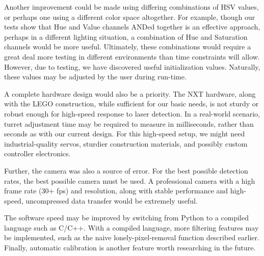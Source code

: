 \documentclass[10pt,twocolumn,letterpaper]{article}
\begin{document}
Another improvement could be made using differing combinations of HSV values, or perhaps one using a different color space altogether.  For example, though our tests show that Hue and Value channels ANDed together is an effective approach, perhaps in a different lighting situation, a combination of Hue and Saturation channels would be more useful.  Ultimately, these combinations would require a great deal more testing in different environments than time constraints will allow.  However, due to testing, we have discovered useful initialization values.  Naturally, these values may be adjusted by the user during run-time.

A complete hardware design would also be a priority.  The NXT hardware, along with the LEGO construction, while sufficient for our basic needs, is not sturdy or robust enough for high-speed response to laser detection.  In a real-world scenario, turret adjustment time may be required to measure in milliseconds, rather than seconds as with our current design.  For this high-speed setup, we might need industrial-quality servos, sturdier construction materials, and possibly custom controller electronics.

Further, the camera was also a source of error.  For the best possible detection rates, the best possible camera must be used.  A professional camera with a high frame rate (30+ fps) and resolution, along with stable performance and high-speed, uncompressed data transfer would be extremely useful.

The software speed may be improved by switching from Python to a compiled language such as C/C++.  With a compiled language, more filtering features may be implemented, such as the naive lonely-pixel-removal function described earlier.  Finally, automatic calibration is another feature worth researching in the future.

{\small


}
\end{document}
